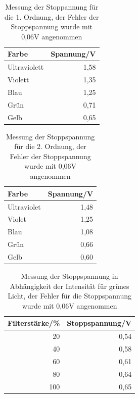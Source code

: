 \documentclass[12px]{scrartcl}
\begin{document}
\begin{table}[H]
\caption{Messung der Stoppannung für die 1. Ordnung, der Fehler der Stoppspannung wurde mit 0,06V angenommen}
\begin{center}
\begin{tabular}{|l|r|}
\hline
Farbe & \multicolumn{1}{l|}{Spannung/V} \\ \hline
Ultraviolett & 1,58 \\ \hline
Violett & 1,35 \\ \hline
Blau & 1,25 \\ \hline
Grün & 0,71 \\ \hline
Gelb & 0,65 \\ \hline
\end{tabular}
\end{center}
\label{tab:a_1_1}
\end{table}

\begin{table}[H]
\caption{Messung der Stoppspannung für die 2. Ordnung, der Fehler der Stoppspannung wurde mit 0,06V angenommen}
\begin{center}
\begin{tabular}{|l|r|}
\hline
Farbe & \multicolumn{1}{l|}{Spannung/V} \\ \hline
Ultraviolet & 1,48 \\ \hline
Violet  & 1,25 \\ \hline
Blau & 1,08 \\ \hline
Grün & 0,66 \\ \hline
Gelb & 0,60 \\ \hline
\end{tabular}
\end{center}
\label{tab:a_1_2}
\end{table}

\begin{table}[H]
\caption{Messung der Stoppspannung in Abhängigkeit der Intensität für grünes Licht, der Fehler für die Stoppspannung wurde mit 0,06V angenommen}
\begin{center}
\begin{tabular}{|r|r|}
\hline
\multicolumn{1}{|l|}{Filterstärke/\%} & \multicolumn{1}{l|}{Stoppspannung/V} \\ \hline
20 & 0,54 \\ \hline
40 & 0,58 \\ \hline
60 & 0,61 \\ \hline
80 & 0,64 \\ \hline
100 & 0,65 \\ \hline
\end{tabular}
\end{center}
\label{tab:intänsität}
\end{table}
\end{document}

